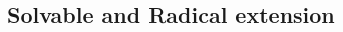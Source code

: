 \documentclass[11pt]{extarticle}
\newcommand{\y}{$\blacksquare\;$}
\begin{document}
\begin{multicols}{2}
 
   \subsection{Solvable and Radical extension}
   

\end{multicols}
\end{document}

